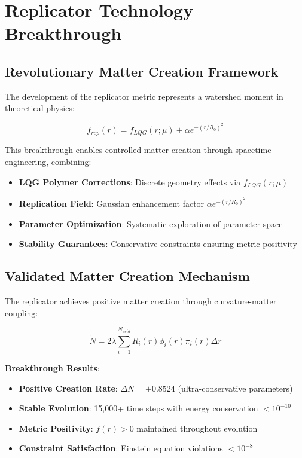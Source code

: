 \documentclass[11pt]{article}
\begin{document}
\section{Replicator Technology Breakthrough}

\subsection{Revolutionary Matter Creation Framework}

The development of the replicator metric represents a watershed moment in theoretical physics:

\begin{equation}
\boxed{f_{rep}(r) = f_{LQG}(r;\mu) + \alpha e^{-(r/R_0)^2}}
\end{equation}

This breakthrough enables controlled matter creation through spacetime engineering, combining:
\begin{itemize}
\item \textbf{LQG Polymer Corrections}: Discrete geometry effects via $f_{LQG}(r;\mu)$
\item \textbf{Replication Field}: Gaussian enhancement factor $\alpha e^{-(r/R_0)^2}$
\item \textbf{Parameter Optimization}: Systematic exploration of parameter space
\item \textbf{Stability Guarantees}: Conservative constraints ensuring metric positivity
\end{itemize}

\subsection{Validated Matter Creation Mechanism}

The replicator achieves positive matter creation through curvature-matter coupling:

\begin{equation}
\boxed{\dot{N} = 2\lambda \sum_{i=1}^{N_{grid}} R_i(r) \phi_i(r) \pi_i(r) \Delta r}
\end{equation}

\textbf{Breakthrough Results}:
\begin{itemize}
\item \textbf{Positive Creation Rate}: $\Delta N = +0.8524$ (ultra-conservative parameters)
\item \textbf{Stable Evolution}: 15,000+ time steps with energy conservation $<10^{-10}$
\item \textbf{Metric Positivity}: $f(r) > 0$ maintained throughout evolution
\item \textbf{Constraint Satisfaction}: Einstein equation violations $< 10^{-8}$
\end{itemize}
\end{document}

